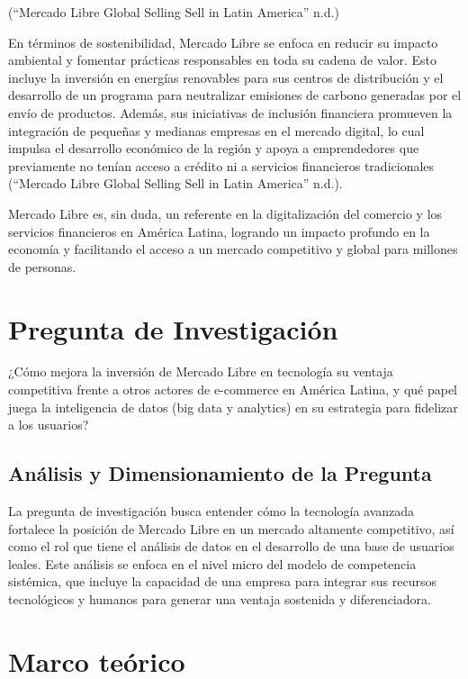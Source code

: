 \documentclass{article}
\begin{document}
({``Mercado {Libre} {Global} {Selling} {\textbar} {Sell} in {Latin}
{America}''} n.d.)

En términos de sostenibilidad, Mercado Libre se enfoca en reducir su
impacto ambiental y fomentar prácticas responsables en toda su cadena de
valor. Esto incluye la inversión en energías renovables para sus centros
de distribución y el desarrollo de un programa para neutralizar
emisiones de carbono generadas por el envío de productos. Además, sus
iniciativas de inclusión financiera promueven la integración de pequeñas
y medianas empresas en el mercado digital, lo cual impulsa el desarrollo
económico de la región y apoya a emprendedores que previamente no tenían
acceso a crédito ni a servicios financieros tradicionales ({``Mercado
{Libre} {Global} {Selling} {\textbar} {Sell} in {Latin} {America}''}
n.d.).

Mercado Libre es, sin duda, un referente en la digitalización del
comercio y los servicios financieros en América Latina, logrando un
impacto profundo en la economía y facilitando el acceso a un mercado
competitivo y global para millones de personas.

\section{Pregunta de Investigación}\label{pregunta-de-investigaciuxf3n}

¿Cómo mejora la inversión de Mercado Libre en tecnología su ventaja
competitiva frente a otros actores de e-commerce en América Latina, y
qué papel juega la inteligencia de datos (big data y analytics) en su
estrategia para fidelizar a los usuarios?

\subsection{Análisis y Dimensionamiento de la
Pregunta}\label{anuxe1lisis-y-dimensionamiento-de-la-pregunta}

La pregunta de investigación busca entender cómo la tecnología avanzada
fortalece la posición de Mercado Libre en un mercado altamente
competitivo, así como el rol que tiene el análisis de datos en el
desarrollo de una base de usuarios leales. Este análisis se enfoca en el
nivel micro del modelo de competencia sistémica, que incluye la
capacidad de una empresa para integrar sus recursos tecnológicos y
humanos para generar una ventaja sostenida y diferenciadora.

\section{Marco teórico}\label{marco-teuxf3rico}
\end{document}
